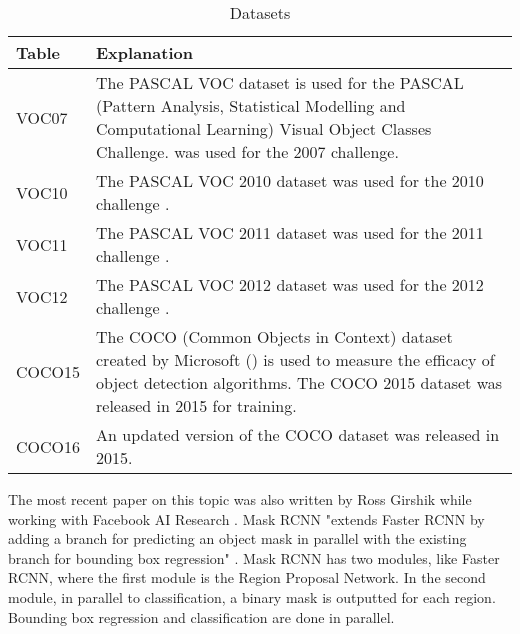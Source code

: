 \begin{table}[h]
\centering
\caption{Datasets}
\label{datasets}
\begin{tabular}{|p{1.65cm}|p{10.5cm}|}
\hline
\textbf{Table} & \textbf{Explanation}                                                                                                                                                                                               \\ \hline
VOC07          & The PASCAL VOC dataset is used for the PASCAL (Pattern Analysis, Statistical Modelling and Computational Learning) Visual Object Classes Challenge. \parencite{pascal-voc-2007} was used for the 2007 challenge. \\ \hline
VOC10          & The PASCAL VOC 2010 dataset was used for the 2010 challenge \parencite{pascal-voc-2010}.                                                                                                                         \\ \hline
VOC11          & The PASCAL VOC 2011 dataset was used for the 2011 challenge \parencite{pascal-voc-2011}.                                                                                                                        \\ \hline
VOC12          & The PASCAL VOC 2012 dataset was used for the 2012 challenge \parencite{pascal-voc-2012}.                                                                                                                        \\ \hline
COCO15         & The COCO (Common Objects in Context) dataset created by Microsoft (\parencite{coco}) is used to measure the efficacy of object detection algorithms. The COCO 2015 dataset was released in 2015 for training.    \\ \hline
COCO16         & An updated version of the COCO dataset was released in 2015.                                                                                                                                                       \\ \hline
\end{tabular}
\end{table}

The most recent paper on this topic was also written by Ross Girshik while
working with Facebook AI Research \parencite{maskRcnn}. Mask RCNN "extends Faster
RCNN by adding a branch for predicting an object mask in parallel with the
existing branch for bounding box regression" \parencite{maskRcnn}.
Mask RCNN has two modules, like Faster RCNN, where the first module is the
Region Proposal Network. In the second module, in parallel to classification, a
binary mask is outputted for each region. Bounding box regression and
classification are done in parallel.

